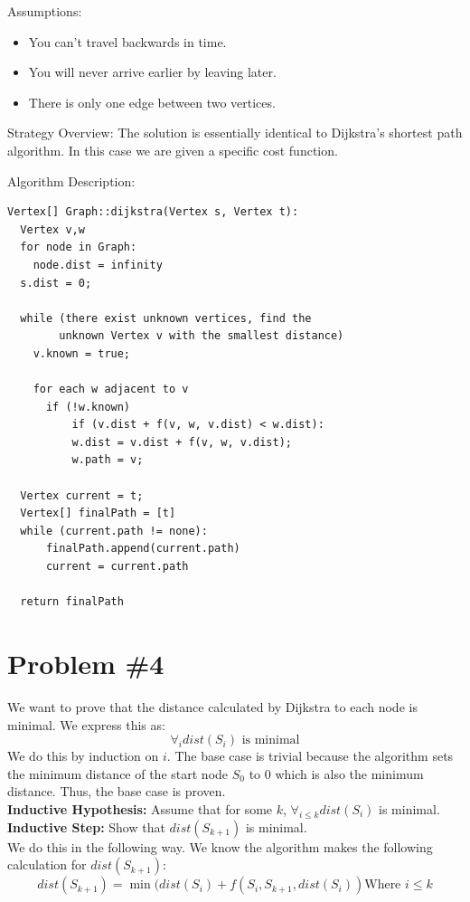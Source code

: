 \documentclass{article}
\begin{document}
Assumptions:
\begin{itemize}
    \item You can't travel backwards in time.
    \item You will never arrive earlier by leaving later.
    \item There is only one edge between two vertices.
\end{itemize}

Strategy Overview:
The solution is essentially identical to Dijkstra's shortest path algorithm. In this case we are given a specific cost function.

Algorithm Description:
\begin{lstlisting}
Vertex[] Graph::dijkstra(Vertex s, Vertex t):
  Vertex v,w
  for node in Graph: 
    node.dist = infinity
  s.dist = 0;

  while (there exist unknown vertices, find the 
        unknown Vertex v with the smallest distance)
    v.known = true;

    for each w adjacent to v
      if (!w.known)
          if (v.dist + f(v, w, v.dist) < w.dist):
          w.dist = v.dist + f(v, w, v.dist);
          w.path = v;
        
  Vertex current = t;
  Vertex[] finalPath = [t]
  while (current.path != none):
      finalPath.append(current.path)
      current = current.path

  return finalPath

\end{lstlisting}

\section*{Problem \#4}
We want to prove that the distance calculated by Dijkstra to each node is minimal. We express this as:
$$\forall_i dist(S_i)\text{ is minimal}$$
We do this by induction on $i$. The base case is trivial because the algorithm sets the minimum distance of the start node $S_0$ to 0 which is also the minimum distance. Thus, the base case is proven.\\
\textbf{Inductive Hypothesis:} Assume that for some $k$, $\forall_{i\le k}dist(S_i)$ is minimal.\\
\textbf{Inductive Step:} Show that $dist(S_{k+1})$ is minimal.\\

We do this in the following way. We know the algorithm makes the following calculation for $dist(S_{k+1})$:
$$dist(S_{k+1}) = \min(dist(S_i) + f(S_i, S_{k+1}, dist(S_i))\text{Where }i\le k$$
\end{document}
